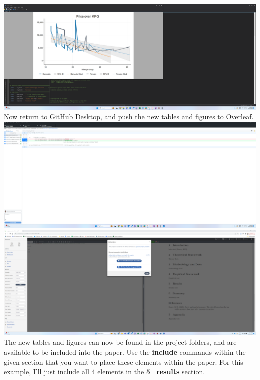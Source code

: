 \documentclass[12pt]{article}
\begin{document}
\includegraphics[width=1\textwidth]{Instructions/project_template_screenshots/project_template_15.png} \\

Now return to GitHub Desktop, and push the new tables and figures to Overleaf. \\ 

\includegraphics[width=1\textwidth]{Instructions/project_template_screenshots/project_template_16.png} \\

\includegraphics[width=1\textwidth]{Instructions/project_template_screenshots/project_template_17.png} \\

The new tables and figures can now be found in the project folders, and are available to be included into the paper. Use the \textbf{include} commands within the given section that you want to place these elements within the paper. For this example, I'll just include all 4 elements in the \textbf{5\_results} section. \\
\end{document}
